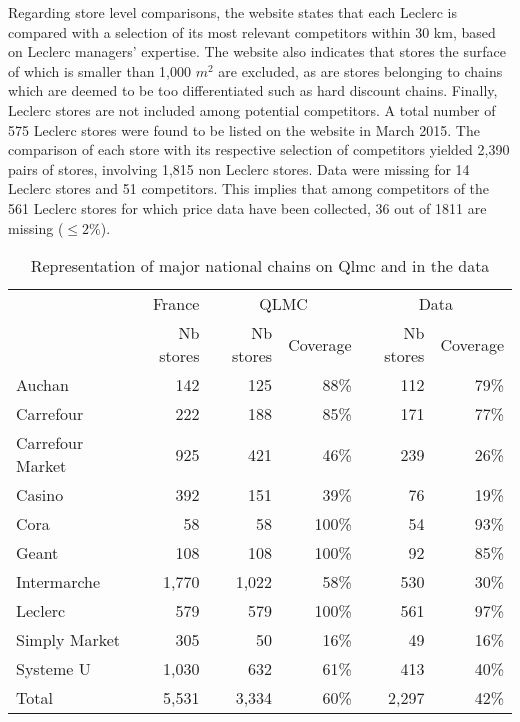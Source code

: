 \documentclass[english]{article}
\begin{document}
Regarding store level comparisons, the website states that each Leclerc is compared with a selection of its most relevant competitors within 30 km, based on Leclerc managers' expertise. The website also indicates that stores the surface of which is smaller than 1,000 $m^2$ are excluded, as are stores belonging to chains which are deemed to be too differentiated such as hard discount chains. Finally, Leclerc stores are not included among potential competitors. A total number of 575 Leclerc stores were found to be listed on the website in March 2015. The comparison of each store with its respective selection of competitors yielded 2,390 pairs of stores, involving 1,815 non Leclerc stores. Data were missing for 14 Leclerc stores and 51 competitors. This implies that among competitors of the 561 Leclerc stores for which price data have been collected, 36 out of 1811 are missing ($\le 2 \%$).

\begin{table}
\caption{Representation of major national chains on Qlmc and in the data}
\label{tab:qlmc_chain_repr}
\begin{threeparttable}
\begin{tabular}{lr|rr|rr}
\toprule
\toprule
          & France & \multicolumn{2}{c|}{QLMC} & \multicolumn{2}{c}{Data} \\
          & Nb stores & Nb stores & Coverage & Nb stores & Coverage \\
\midrule
    Auchan & 142   & 125   & 88\%  & 112   & 79\% \\
    Carrefour & 222   & 188   & 85\%  & 171   & 77\% \\
    Carrefour Market & 925   & 421   & 46\%  & 239   & 26\% \\
    Casino & 392   & 151   & 39\%  & 76    & 19\% \\
    Cora  & 58    & 58    & 100\% & 54    & 93\% \\
    Geant & 108   & 108   & 100\% & 92    & 85\% \\
    Intermarche & 1,770 & 1,022 & 58\%  & 530   & 30\% \\
    Leclerc & 579   & 579   & 100\% & 561   & 97\% \\
    Simply Market & 305   & 50    & 16\%  & 49    & 16\% \\
    Systeme U & 1,030 & 632   & 61\%  & 413   & 40\% \\
\midrule		
    Total & 5,531 & 3,334 & 60\%  & 2,297 & 42\% \\
\bottomrule
\bottomrule
\end{tabular}
\end{threeparttable}
\end{table}
\end{document}
